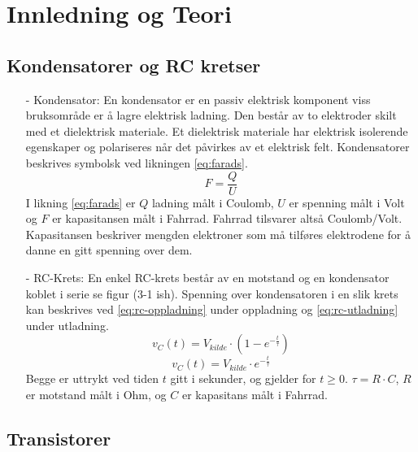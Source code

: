 \section{Innledning og Teori}

\subsection{Kondensatorer og RC kretser}

    \begin{itemize}
        \item[-] Kondensator: En kondensator er en passiv elektrisk komponent viss bruksområde er å lagre elektrisk ladning.
        Den består av to elektroder skilt med et dielektrisk materiale.
        Et dielektrisk materiale har elektrisk isolerende egenskaper og polariseres når det påvirkes av et elektrisk felt.
        Kondensatorer beskrives symbolsk ved likningen \ref{eq:farads}.
        \begin{equation}
            F = \frac{Q}{U}
            \label{eq:farads}
        \end{equation}
        I likning \ref{eq:farads} er $Q$ ladning målt i Coulomb, $U$ er spenning målt i Volt og $F$ er kapasitansen målt i Fahrrad.
        Fahrrad tilsvarer altså Coulomb/Volt.
        Kapasitansen beskriver mengden elektroner som må tilføres elektrodene for å danne en gitt spenning over dem.
        \item[-] RC-Krets: En enkel RC-krets består av en motstand og en kondensator koblet i serie se figur (3-1 ish).
        Spenning over kondensatoren i en slik krets kan beskrives ved \ref{eq:rc-oppladning} under oppladning og \ref{eq:rc-utladning} under utladning.
        \begin{equation}
            v_{C}(t) = V_{kilde} \cdot \left( 1 - e^{-\frac{t}{\tau}} \right)
            \label{eq:rc-oppladning}
        \end{equation}
        \begin{equation}
            v_{C}(t) = V_{kilde} \cdot e^{-\frac{t}{\tau}}
            \label{eq:rc-utladning}
        \end{equation}
        Begge er uttrykt ved tiden $t$ gitt i sekunder, og gjelder for $t \geq 0$.
        $\tau = R \cdot C$, $R$ er motstand målt i Ohm, og $C$ er kapasitans målt i Fahrrad.
    \end{itemize}

\subsection{Transistorer}

